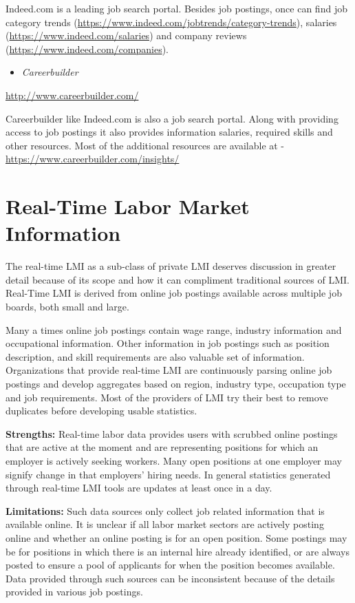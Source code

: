 \documentclass[]{book}
\providecommand{\tightlist}{%
  \setlength{\itemsep}{0pt}\setlength{\parskip}{0pt}}
\theoremstyle{definition}
\theoremstyle{definition}
\theoremstyle{definition}
\theoremstyle{remark}
\begin{document}
Indeed.com is a leading job search portal. Besides job postings, once
can find job category trends
(\url{https://www.indeed.com/jobtrends/category-trends}), salaries
(\url{https://www.indeed.com/salaries}) and company reviews
(\url{https://www.indeed.com/companies}).

\begin{itemize}
\tightlist
\item
  \emph{Careerbuilder}
\end{itemize}

\url{http://www.careerbuilder.com/}

Careerbuilder like Indeed.com is also a job search portal. Along with
providing access to job postings it also provides information salaries,
required skills and other resources. Most of the additional resources
are available at - \url{https://www.careerbuilder.com/insights/}

\section{Real-Time Labor Market
Information}\label{real-time-labor-market-information}

The real-time LMI as a sub-class of private LMI deserves discussion in
greater detail because of its scope and how it can compliment
traditional sources of LMI. Real-Time LMI is derived from online job
postings available across multiple job boards, both small and large.

Many a times online job postings contain wage range, industry
information and occupational information. Other information in job
postings such as position description, and skill requirements are also
valuable set of information. Organizations that provide real-time LMI
are continuously parsing online job postings and develop aggregates
based on region, industry type, occupation type and job requirements.
Most of the providers of LMI try their best to remove duplicates before
developing usable statistics.

\textbf{Strengths:} Real-time labor data provides users with scrubbed
online postings that are active at the moment and are representing
positions for which an employer is actively seeking workers. Many open
positions at one employer may signify change in that employers' hiring
needs. In general statistics generated through real-time LMI tools are
updates at least once in a day.

\textbf{Limitations:} Such data sources only collect job related
information that is available online. It is unclear if all labor market
sectors are actively posting online and whether an online posting is for
an open position. Some postings may be for positions in which there is
an internal hire already identified, or are always posted to ensure a
pool of applicants for when the position becomes available. Data
provided through such sources can be inconsistent because of the details
provided in various job postings.
\end{document}
